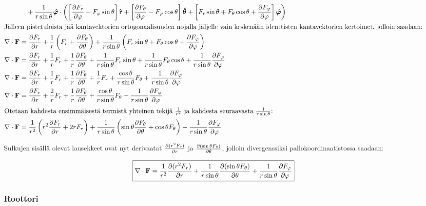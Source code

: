\documentclass[../johdoksia.tex]{subfiles}
\begin{document}
\begin{enumerate}
\begin{align}
			&\quad + \frac{1}{r\sin\theta}\boldsymbol{\hat{\varphi}}\cdot\left(\left[\pdv{F_r}{\varphi} - F_\varphi\sin\theta\right]\mathbf{\hat{r}} + \left[\pdv{F_\theta}{\varphi} - F_\varphi\cos\theta\right]\boldsymbol{\hat{\theta}} + \left[F_r\sin\theta + F_\theta\cos\theta + \pdv{F_\varphi}{\varphi}\right]\boldsymbol{\hat{\varphi}}\right) \\
			\intertext{Jälleen pistetuloista jää kantavektorien ortogonaalisuuden nojalla jäljelle vain keskenään identtisten kantavektorien kertoimet, jolloin saadaan:}
			\nabla\cdot\mathbf{F} &= \pdv{F_r}{r} + \frac{1}{r}\left(F_r + \pdv{F_\theta}{\theta}\right) + \frac{1}{r\sin\theta}\left(F_r\sin\theta + F_\theta\cos\theta + \pdv{F_\varphi}{\varphi}\right) \\
			\nabla\cdot\mathbf{F} &= \pdv{F_r}{r} + \frac{1}{r}F_r + \frac{1}{r}\pdv{F_\theta}{\theta} + \frac{1}{r\sin\theta}F_r\sin\theta + \frac{1}{r\sin\theta}F_\theta\cos\theta + \frac{1}{r\sin\theta}\pdv{F_\varphi}{\varphi} \\
			\nabla\cdot\mathbf{F} &= \pdv{F_r}{r} + \frac{1}{r}F_r + \frac{1}{r}\pdv{F_\theta}{\theta} + \frac{1}{r}F_r + \frac{\cos\theta}{r\sin\theta}F_\theta + \frac{1}{r\sin\theta}\pdv{F_\varphi}{\varphi} \\
			\nabla\cdot\mathbf{F} &= \pdv{F_r}{r} + \frac{2}{r}F_r + \frac{1}{r}\pdv{F_\theta}{\theta} + \frac{\cos\theta}{r\sin\theta}F_\theta + \frac{1}{r\sin\theta}\pdv{F_\varphi}{\varphi} \\
			\intertext{Otetaan kahdesta ensimmäisestä termistä yhteinen tekijä $\frac{1}{r^2}$ ja kahdesta seuraavasta $\frac{1}{r\sin\theta}$:}
			\nabla\cdot\mathbf{F} &= \frac{1}{r^2}\left(r^2\pdv{F_r}{r} + 2rF_r\right) + \frac{1}{r\sin\theta}\left(\sin\theta\pdv{F_\theta}{\theta} + \cos\theta F_\theta\right) + \frac{1}{r\sin\theta}\pdv{F_\varphi}{\varphi}
		\end{align}
		
		\noindent Sulkujen sisällä olevat lausekkeet ovat nyt derivaatat $\pdv{(r^2F_r)}{r}$ ja $\pdv{(\sin\theta F_\theta)}{\theta}$, jolloin divergenssiksi pallokoordinaatistossa saadaan:
		
		\begin{equation}
			\boxed{\nabla\cdot\mathbf{F} = \frac{1}{r^2}\pdv{(r^2F_r)}{r} + \frac{1}{r\sin\theta}\pdv{(\sin\theta F_\theta)}{\theta} + \frac{1}{r\sin\theta}\pdv{F_\varphi}{\varphi}}
		\end{equation}
	\end{enumerate}
	
	
	\subsubsection{Roottori}
	
\end{document}
